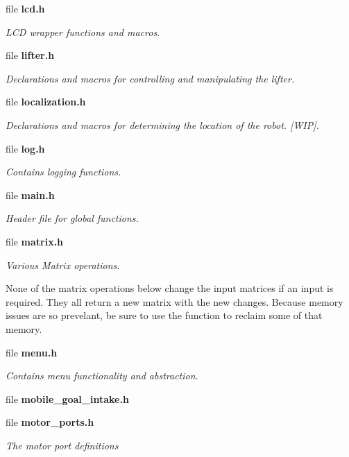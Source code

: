 \begin{DoxyCompactItemize}
file \textbf{ lcd.\+h}
\begin{DoxyCompactList}\small\item\em L\+CD wrapper functions and macros. \end{DoxyCompactList}\item 
file \textbf{ lifter.\+h}
\begin{DoxyCompactList}\small\item\em Declarations and macros for controlling and manipulating the lifter. \end{DoxyCompactList}\item 
file \textbf{ localization.\+h}
\begin{DoxyCompactList}\small\item\em Declarations and macros for determining the location of the robot. [W\+IP]. \end{DoxyCompactList}\item 
file \textbf{ log.\+h}
\begin{DoxyCompactList}\small\item\em Contains logging functions. \end{DoxyCompactList}\item 
file \textbf{ main.\+h}
\begin{DoxyCompactList}\small\item\em Header file for global functions. \end{DoxyCompactList}\item 
file \textbf{ matrix.\+h}
\begin{DoxyCompactList}\small\item\em Various Matrix operations.

None of the matrix operations below change the input matrices if an input is required. They all return a new matrix with the new changes. Because memory issues are so prevelant, be sure to use the  function to reclaim some of that memory. \end{DoxyCompactList}\item 
file \textbf{ menu.\+h}
\begin{DoxyCompactList}\small\item\em Contains menu functionality and abstraction. \end{DoxyCompactList}\item 
file \textbf{ mobile\+\_\+goal\+\_\+intake.\+h}
\item 
file \textbf{ motor\+\_\+ports.\+h}
\begin{DoxyCompactList}\small\item\em The motor port definitions


\end{DoxyCompactList}
\end{DoxyCompactItemize}
